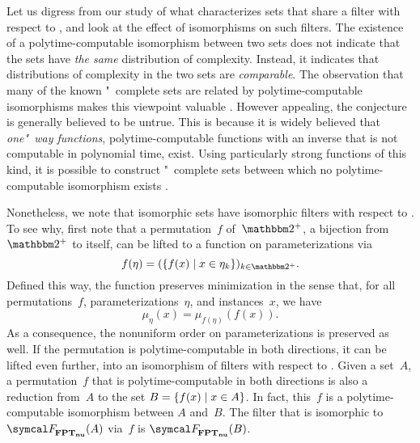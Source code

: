 \medbreak
Let us digress from our study of what characterizes sets that share a filter with respect to , and look at the effect of isomorphisms on such filters.
The existence of a polytime-computable isomorphism between two sets does not indicate that the sets have \emph{the same} distribution of complexity.
Instead, it indicates that distributions of complexity in the two sets are \emph{comparable}.
The observation that many of the known "~complete sets are related by polytime-computable isomorphisms makes this viewpoint valuable \parencite{berman1977isomorphisms,goldsmith1996scalability}.
However appealing, the conjecture is generally believed to be untrue.
This is because it is widely believed that \emph{one"~way functions}, polytime-computable functions with an inverse that is not computable in polynomial time, exist.
Using particularly strong functions of this kind, it is possible to construct "~complete sets between which no polytime-computable isomorphism exists \parencite{young1983some,kurtz1989isomorphism,hartmanis1991one,agrawal2009one}.

Nonetheless, we note that isomorphic sets have isomorphic filters with respect to .
To see why, first note that a permutation~$f$ of~$\binary^+$, a bijection from $\binary^+$ to itself, can be lifted to a function on parameterizations via
\begin{equation*}
  f(\eta) = (\{f(x) \st x \in \eta_k\})_{k \in \binary^+}.
\end{equation*}
Defined this way, the function preserves minimization in the sense that, for all permutations~$f$, parameterizations~$\eta$, and instances~$x$, we have
\begin{equation*}
  \mu_\eta(x) = \mu_{f(\eta)}(f(x)).
\end{equation*}
As a consequence, the nonuniform order on parameterizations is preserved as well.
If the permutation is polytime-computable in both directions, it can be lifted even further, into an isomorphism of filters with respect to .
Given a set~$A$, a permutation~$f$ that is polytime-computable in both directions is also a reduction from~$A$ to the set $B = \{f(x) \;|\; x \in A\}$.
In fact, this~$f$ is a polytime-computable isomorphism between $A$ and~$B$.
The filter that is isomorphic to $\calF_\clnu{FPT}(A)$ via~$f$ is $\calF_\clnu{FPT}(B)$.

